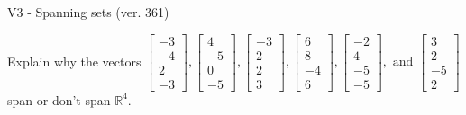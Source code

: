 \begin{exercise}
  \begin{exerciseTitle}V3 - Spanning sets (ver. 361)\end{exerciseTitle}
  \begin{exerciseStatement}
    Explain why the vectors \(\left[\begin{array}{r}
-3 \\
-4 \\
2 \\
-3
\end{array}\right] , \left[\begin{array}{r}
4 \\
-5 \\
0 \\
-5
\end{array}\right] , \left[\begin{array}{r}
-3 \\
2 \\
2 \\
3
\end{array}\right] , \left[\begin{array}{r}
6 \\
8 \\
-4 \\
6
\end{array}\right] , \left[\begin{array}{r}
-2 \\
4 \\
-5 \\
-5
\end{array}\right] , \text{ and } \left[\begin{array}{r}
3 \\
2 \\
-5 \\
2
\end{array}\right]\) span or don't span \(\mathbb{R}^4\). 
	



\end{exerciseStatement}
\end{exercise}
